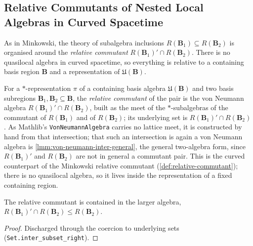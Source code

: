 \subsection{Relative Commutants of Nested Local Algebras in Curved Spacetime}

As in Minkowski, the theory of subalgebra inclusions $R(\mathbf{B}_1) \subseteq R(\mathbf{B}_2)$ is organised around the \emph{relative commutant} $R(\mathbf{B}_1)' \cap R(\mathbf{B}_2)$. There is no quasilocal algebra in curved spacetime, so everything is relative to a containing basis region $\mathbf{B}$ and a representation of $\mathfrak{U}(\mathbf{B})$.

\begin{definition}
    \label{def:relative-commutant-in-curved-spacetime}
    \leanok
    For a $*$-representation $\pi$ of a containing basis algebra $\mathfrak{U}(\mathbf{B})$ and two basis subregions $\mathbf{B}_1, \mathbf{B}_2 \subseteq \mathbf{B}$, the \emph{relative commutant} of the pair is the von Neumann algebra $R(\mathbf{B}_1)' \cap R(\mathbf{B}_2)$, built as the meet of the $*$-subalgebras of the commutant of $R(\mathbf{B}_1)$ and of $R(\mathbf{B}_2)$; its underlying set is $R(\mathbf{B}_1)' \cap R(\mathbf{B}_2)$. As Mathlib's \texttt{VonNeumannAlgebra} carries no lattice meet, it is constructed by hand from that intersection; that such an intersection is again a von Neumann algebra is \ref{lmm:von-neumann-inter-general}, the general two-algebra form, since $R(\mathbf{B}_1)'$ and $R(\mathbf{B}_2)$ are not in general a commutant pair. This is the curved counterpart of the Minkowski relative commutant (\ref{def:relative-commutant}); there is no quasilocal algebra, so it lives inside the representation of a fixed containing region.
\end{definition}

\begin{theorem}
    \label{thrm:relative-commutant-le-right-in-curved-spacetime}
    \leanok
    The relative commutant is contained in the larger algebra, $R(\mathbf{B}_1)' \cap R(\mathbf{B}_2) \le R(\mathbf{B}_2)$.
\end{theorem}
\begin{proof}
    \leanok
    Discharged through the coercion to underlying sets (\texttt{Set.inter\_subset\_right}).
\end{proof}

